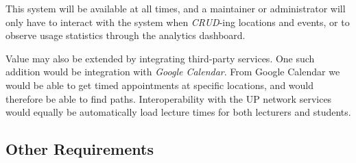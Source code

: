 \documentclass[12pt,a4paper]{article}
\begin{document}
			This system will be available at all times, and a maintainer or
			administrator will only have to interact with the system when
			\textsl{CRUD}-ing locations and events, or to observe usage statistics
			through the analytics dashboard.

			\medskip

			Value may also be extended by integrating third-party services. One such
			addition would be integration with \textsl{Google Calendar}. From Google
			Calendar we would be able to get timed appointments at specific locations,
			and would therefore be able to find paths. Interoperability with the UP
			network services would equally be automatically load lecture times for
			both lecturers and students.

		\subsection{Other Requirements}
\end{document}
